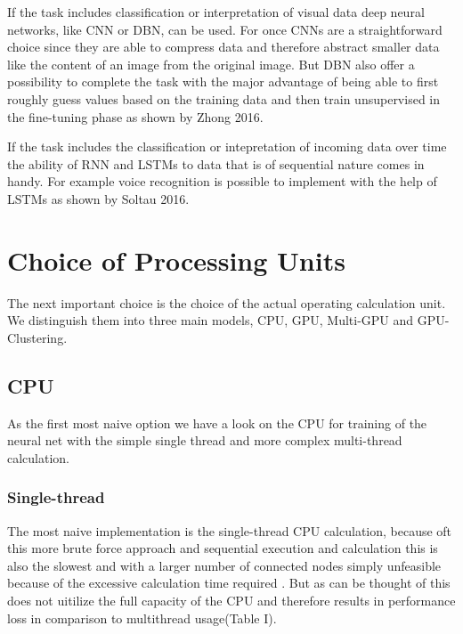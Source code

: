 \documentclass[conference]{IEEEtran}
\begin{document}
If the task includes classification or interpretation of visual data deep neural networks, like CNN or DBN, can be used. For once CNNs are a straightforward choice since they are able to compress data and therefore abstract smaller data like the content of an image from the original image. But DBN also offer a possibility to complete the task with the major advantage of being able to first roughly guess values based on the training data and then train unsupervised in the fine-tuning phase as shown by Zhong 2016\cite{zhong2016diversified}.

If the task includes the classification or intepretation of incoming data over time the ability of RNN and LSTMs to data that is of sequential nature comes in handy. For example voice recognition is possible to implement with the help of LSTMs as shown by Soltau 2016\cite{soltau2016neural}.






\section{Choice of Processing Units}
The next important choice is the choice of the actual operating calculation unit. We distinguish them into three main models, CPU, GPU, Multi-GPU and GPU-Clustering.


\subsection{CPU}
As the first most naive option we have a look on the CPU for training of the neural net with the simple single thread and more complex multi-thread calculation.


\subsubsection{Single-thread}
The most naive implementation is the single-thread CPU calculation, because oft this more  brute force approach and sequential execution and calculation this is also the slowest and with a larger number of connected nodes simply unfeasible because of the excessive calculation time required . But as can be thought of this does not uitilize the full capacity of the CPU and therefore results in performance loss in comparison to multithread usage(Table I).
\end{document}
